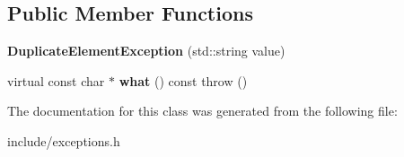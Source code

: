 \subsection*{Public Member Functions}
\begin{DoxyCompactItemize}
\item 
\hypertarget{class_duplicate_element_exception_ab1804ab13d350d893d3d003f13035232}{{\bfseries Duplicate\+Element\+Exception} (std\+::string value)}\label{class_duplicate_element_exception_ab1804ab13d350d893d3d003f13035232}

\item 
\hypertarget{class_duplicate_element_exception_a5021dd1ab2a52d557f04e55fb792de47}{virtual const char $\ast$ {\bfseries what} () const   throw ()}\label{class_duplicate_element_exception_a5021dd1ab2a52d557f04e55fb792de47}

\end{DoxyCompactItemize}


The documentation for this class was generated from the following file\+:\begin{DoxyCompactItemize}
\item 
include/exceptions.\+h\end{DoxyCompactItemize}
